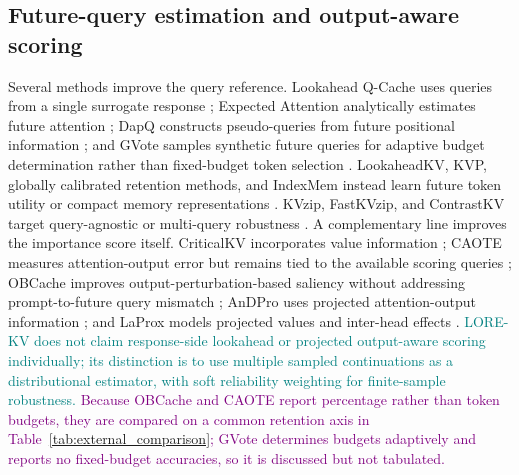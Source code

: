 \documentclass{article} %
\begin{document}
\subsection{Future-query estimation and output-aware scoring} \label{subsec:rw_future}
Several methods improve the query reference. Lookahead Q-Cache uses queries from a single surrogate response \citep{wang2025lookahead}; Expected Attention analytically estimates future attention \citep{devoto2025expected}; DapQ constructs pseudo-queries from future positional information \citep{tian2026dapq}; and GVote samples synthetic future queries for adaptive budget determination rather than fixed-budget token selection \citep{tang2025adaptive}. LookaheadKV, KVP, globally calibrated retention methods, and IndexMem instead learn future token utility or compact memory representations \citep{ahn2026lookaheadkv,moschella2026learning,bui2026make,yang2026indexmem}. KVzip, FastKVzip, and ContrastKV target query-agnostic or multi-query robustness \citep{kim2026fastkvzip,kim2026kvzip,chen2026contrastkv}. A complementary line improves the importance score itself. CriticalKV incorporates value information \citep{guo2024criticalkv}; CAOTE measures attention-output error but remains tied to the available scoring queries \citep{goel2025caote}; OBCache improves output-perturbation-based saliency without addressing prompt-to-future query mismatch \citep{gu2025obcache}; AnDPro uses projected attention-output information \citep{geng2026accurate}; and LaProx models projected values and inter-head effects \citep{mai2026reformulating}. \textcolor{teal}{LORE-KV does not claim response-side lookahead or projected output-aware scoring individually; its distinction is to use multiple sampled continuations as a distributional estimator, with soft reliability weighting for finite-sample robustness.} \textcolor{purple}{Because OBCache and CAOTE report percentage rather than token budgets, they are compared on a common retention axis in Table~\ref{tab:external_comparison}; GVote determines budgets adaptively and reports no fixed-budget accuracies, so it is discussed but not tabulated.}
\end{document}
